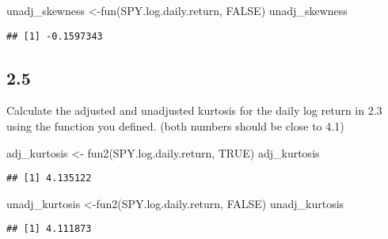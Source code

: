 \documentclass[
]{article}
\newenvironment{Shaded}{\begin{snugshade}}{\end{snugshade}}
\newcommand{\ConstantTok}[1]{\textcolor[rgb]{0.00,0.00,0.00}{#1}}
\newcommand{\FunctionTok}[1]{\textcolor[rgb]{0.00,0.00,0.00}{#1}}
\newcommand{\NormalTok}[1]{#1}
\newcommand{\OtherTok}[1]{\textcolor[rgb]{0.56,0.35,0.01}{#1}}
\begin{document}
\begin{Shaded}
\begin{Highlighting}[]
\NormalTok{unadj\_skewness }\OtherTok{\textless{}{-}}\FunctionTok{fun}\NormalTok{(SPY.log.daily.return, }\ConstantTok{FALSE}\NormalTok{)}
\NormalTok{unadj\_skewness}
\end{Highlighting}
\end{Shaded}

\begin{verbatim}
## [1] -0.1597343
\end{verbatim}

\hypertarget{section-11}{%
\subsection{2.5}\label{section-11}}

Calculate the adjusted and unadjusted kurtosis for the daily log return
in 2.3 using the function you defined. (both numbers should be close to
4.1)

\begin{Shaded}
\begin{Highlighting}[]
\NormalTok{adj\_kurtosis }\OtherTok{\textless{}{-}} \FunctionTok{fun2}\NormalTok{(SPY.log.daily.return, }\ConstantTok{TRUE}\NormalTok{)}
\NormalTok{adj\_kurtosis}
\end{Highlighting}
\end{Shaded}

\begin{verbatim}
## [1] 4.135122
\end{verbatim}

\begin{Shaded}
\begin{Highlighting}[]
\NormalTok{unadj\_kurtosis }\OtherTok{\textless{}{-}}\FunctionTok{fun2}\NormalTok{(SPY.log.daily.return, }\ConstantTok{FALSE}\NormalTok{)}
\NormalTok{unadj\_kurtosis}
\end{Highlighting}
\end{Shaded}

\begin{verbatim}
## [1] 4.111873
\end{verbatim}
\end{document}
